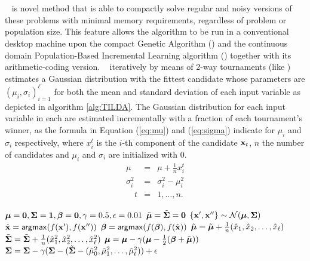 \chapter{\TILDA}
\label{ch:tilda}

\TILDA~ is novel method that is able to compactly solve regular and noisy versions of these problems with minimal memory requirements, regardless of problem or population size. This feature allows the algorithm to be run in a conventional desktop machine upon the compact Genetic Algorithm (\cGA) and the continuous domain Population-Based Incremental Learning algorithm (\PBILc) together with its arithmetic-coding version. \TILDA~ iteratively by means of 2-way tournaments (like \cGA) estimates a Gaussian distribution with the fittest candidate whose parameters are $(\mu_i, \sigma_i)_{i=1}^{\ell}$ for both the mean and standard deviation of each input variable as depicted in algorithm \ref{alg:TILDA}.  The Gaussian distribution for each input variable in each are estimated incrementally  with a fraction of each tournament's winner, as the formula in Equation (\ref{eq:mu}) and (\ref{eq:sigma}) indicate for $\mu_i$ and $\sigma_i$ respectively, where $x^{t}_i$ is the $i$-th component of the candidate ${\mathbf x}_{t}$, $n$ the number of candidates and $\mu_i$ and $\sigma_i$ are initialized with $0$.
\begin{eqnarray}
\mu&=&\mu+\tfrac{1}{n} x_i^{t} \label{eq:mu} \\
\sigma_i^2 &=& \sigma_i^2-\mu_i^2 \label{eq:sigma} \\
\quad t&=&1,\ldots,n. \nonumber
\end{eqnarray}


\begin{algorithm}
	\caption{\TILDA} 
	\begin{algorithmic}[1]
		\STATE ${\boldsymbol \mu}=\mathbf{0}, {\boldsymbol \Sigma}=\mathbf{1}, {\boldsymbol \beta}=\mathbf{0}, \gamma=0.5, \epsilon=0.01$
		 \label{tilda:genloop}
			\STATE $\tilde{{\boldsymbol \mu}}=\tilde{{\boldsymbol \Sigma}}=\mathbf{0}$
			 \label{tilda:poploop}
				\STATE $\{{\mathbf x}^{\prime},{\mathbf x}^{\prime\prime}\} \sim {\cal N}({\boldsymbol \mu}, {\boldsymbol \Sigma})$ \label{acGA:sampling} \label{tilda:sampling}
				\STATE $\hat{{\mathbf x}} = \mathsf{argmax}(f({\mathbf x}^{\prime}), f({\mathbf x}^{\prime\prime}))$ \label{tilda:2way}
				\STATE ${\boldsymbol \beta} = \mathsf{argmax}(f({\boldsymbol \beta}), f(\hat{{\mathbf x}}))$ \label{tilda:beta}
				\STATE $\tilde{{\boldsymbol \mu}} = \tilde{{\boldsymbol \mu}} + \frac{1}{n}(\hat{x}_1,\hat{x}_2,\ldots,\hat{x}_{\ell})$ \label{tilda:muhat}
				\STATE \vspace{1mm}$\tilde{{\boldsymbol \Sigma}} = \tilde{{\boldsymbol \Sigma}} + \frac{1}{n}(\hat{x}_1^2,\hat{x}_2^2,\ldots,\hat{x}_{\ell}^2)$	 \label{tilda:sigmahat}
			\ENDFOR			
			\STATE ${\boldsymbol \mu}={\boldsymbol \mu}-\gamma({\boldsymbol \mu}-\frac{1}{2}({\boldsymbol \beta}+\tilde{{\boldsymbol \mu}}))$ \label{tilda:mu}
			\STATE ${\boldsymbol \Sigma}={\boldsymbol \Sigma}-\gamma({\boldsymbol \Sigma}-(\tilde{{\boldsymbol \Sigma}}-(\tilde{\mu}_0^2, \tilde{\mu}_1^2,\ldots, \tilde{\mu}_{\ell}^2))+\epsilon$	 \label{tilda:sigma}		
		\ENDWHILE
	\end{algorithmic}  
	\label{alg:TILDA}
\end{algorithm}
